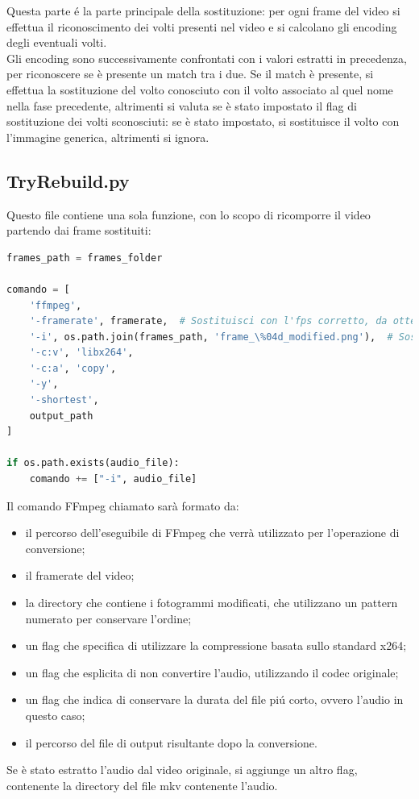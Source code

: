 \documentclass{report}
\begin{document}
Questa parte é la parte principale della sostituzione: per ogni frame del video si effettua il riconoscimento dei volti presenti nel video e si calcolano gli encoding degli eventuali volti. \\
Gli encoding sono successivamente confrontati con i valori estratti in precedenza, per riconoscere se è presente un match tra i due. Se il match è presente, si effettua la sostituzione del volto conosciuto con il volto associato al quel nome nella fase precedente, altrimenti si valuta se è stato impostato il flag di sostituzione dei volti sconosciuti: se è stato impostato, si sostituisce il volto con l'immagine generica, altrimenti si ignora.

\subsection{TryRebuild.py}
Questo file contiene una sola funzione, con lo scopo di ricomporre il video partendo dai frame sostituiti:
\begin{lstlisting}[language=Python, breaklines=true]
frames_path = frames_folder

comando = [
    'ffmpeg',
    '-framerate', framerate,  # Sostituisci con l'fps corretto, da ottenere tramite la funzione get_framerate
    '-i', os.path.join(frames_path, 'frame_\%04d_modified.png'),  # Sostituisci con il pattern corretto
    '-c:v', 'libx264',
    '-c:a', 'copy',
    '-y',
    '-shortest',
    output_path
]

if os.path.exists(audio_file):
    comando += ["-i", audio_file]
\end{lstlisting}
Il comando FFmpeg chiamato sarà formato da:
\begin{itemize}
  \item
        il percorso dell'eseguibile di FFmpeg che verrà utilizzato per l'operazione di conversione;
  \item
        il framerate del video;
  \item
        la directory che contiene i fotogrammi modificati, che utilizzano un pattern numerato per conservare l'ordine;
  \item
        un flag che specifica di utilizzare la compressione basata sullo standard x264;
  \item
        un flag che esplicita di non convertire l’audio, utilizzando il codec originale;
  \item
        un flag che indica di conservare la durata del file piú corto, ovvero l'audio in questo caso;
  \item
        il percorso del file di output risultante dopo la conversione.
\end{itemize}
Se è stato estratto l'audio dal video originale, si aggiunge un altro flag, contenente la directory del file mkv contenente l'audio.
\end{document}

